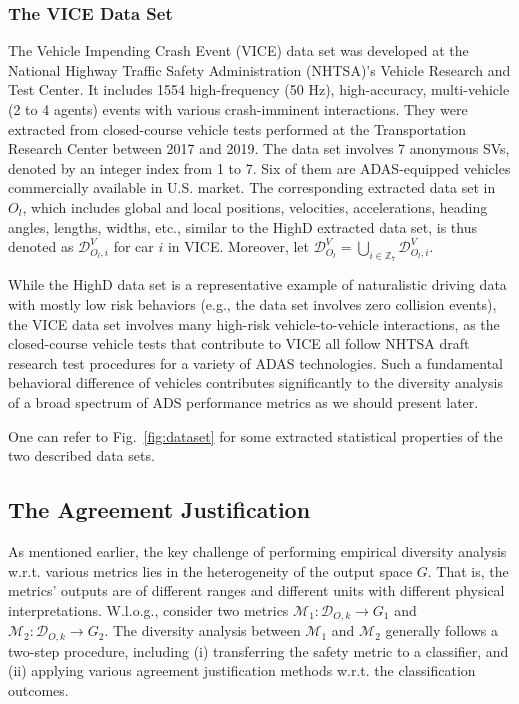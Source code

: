 \documentclass[journal]{IEEEtran}
\newcommand{\Z}{\mathbb{Z}}
\begin{document}
\subsubsection{The VICE Data Set}\label{sec:data:vice}
The Vehicle Impending Crash Event (VICE) data set was developed at the National Highway Traffic Safety Administration (NHTSA)'s Vehicle Research and Test Center. It includes 1554 high-frequency (50 Hz), high-accuracy, multi-vehicle (2 to 4 agents) events with various crash-imminent interactions. They were extracted from closed-course vehicle tests performed at the Transportation Research Center between 2017 and 2019. The data set involves 7 anonymous SVs, denoted by an integer index from 1 to 7. Six of them are ADAS-equipped vehicles commercially available in U.S. market. The corresponding extracted data set in $O_l$, which includes global and local positions, velocities, accelerations, heading angles, lengths, widths, etc., similar to the HighD extracted data set, is thus denoted as $\mathcal{D}^V_{O_l, i}$ for car $i$ in VICE. Moreover, let $\mathcal{D}^V_{O_l} = \bigcup_{i\in\Z_7}\mathcal{D}^V_{O_l, i}$.

While the HighD data set is a representative example of naturalistic driving data with mostly low risk behaviors (e.g., the data set involves zero collision events), the VICE data set involves many high-risk vehicle-to-vehicle interactions, as the closed-course vehicle tests that contribute to VICE all follow NHTSA draft research test procedures for a variety of ADAS technologies. Such a fundamental behavioral difference of vehicles contributes significantly to the diversity analysis of a broad spectrum of ADS performance metrics as we should present later.

One can refer to Fig.~\ref{fig:dataset} for some extracted statistical properties of the two described data sets.

\subsection{The Agreement Justification}\label{sec:agreementjustification}

As mentioned earlier, the key challenge of performing empirical diversity analysis w.r.t. various metrics lies in the heterogeneity of the output space $G$. That is, the metrics' outputs are of different ranges and different units with different physical interpretations. W.l.o.g., consider two metrics $\mathcal{M}_1: \mathcal{D}_{O, k} \rightarrow G_1$ and $\mathcal{M}_2: \mathcal{D}_{O, k} \rightarrow G_2$. The diversity analysis between $\mathcal{M}_1$ and $\mathcal{M}_2$ generally follows a two-step procedure, including (i) transferring the safety metric to a classifier, and (ii) applying various agreement justification methods w.r.t. the classification outcomes.
\end{document}

